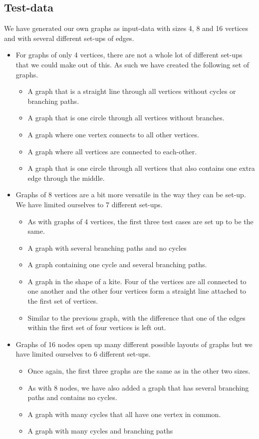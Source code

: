 \documentclass[a4paper,12pt,twoside]{article}
\begin{document}
\subsection{Test-data}
We have generated our own graphs as input-data with sizes 4, 8 and 16 vertices and with several different set-ups of edges.
\begin{itemize}
\item For graphs of only 4 vertices, there are not a whole lot of different set-ups that we could make out of this. As such we have created the following set of graphs.
\begin{itemize}
\item A graph that is a straight line through all vertices without cycles or branching paths.
\item A graph that is one circle through all vertices without branches.
\item A graph where one vertex connects to all other vertices.
\item A graph where all vertices are connected to each-other.
\item A graph that is one circle through all vertices that also contains one extra edge through the middle.
\end{itemize}
\item Graphs of 8 vertices are a bit more versatile in the way they can be set-up. We have limited ourselves to 7 different set-ups.
\begin{itemize}
\item As with graphs of 4 vertices, the first three test cases are set up to be the same.
\item A graph with several branching paths and no cycles
\item A graph containing one cycle and several branching paths.
\item A graph in the shape of a kite. Four of the vertices are all connected to one another and the other four vertices form a straight line attached to the first set of vertices.
\item Similar to the previous graph, with the difference that one of the edges within the first set of four vertices is left out.
\end{itemize}
\item Graphs of 16 nodes open up many different possible layouts of graphs but we have limited ourselves to 6 different set-ups.
\begin{itemize}
\item Once again, the first three graphs are the same as in the other two sizes.
\item As with 8 nodes, we have also added a graph that has several branching paths and contains no cycles.
\item A graph with many cycles that all have one vertex in common.
\item A graph with many cycles and branching paths
\end{itemize}
\end{itemize}
\end{document}
